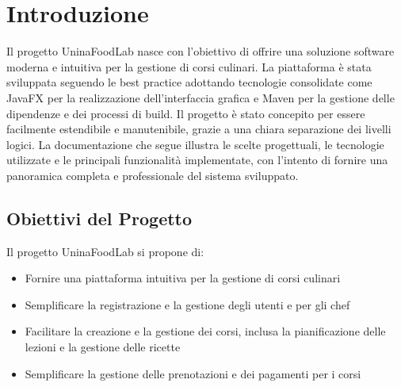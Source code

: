 \section{Introduzione}

Il progetto UninaFoodLab nasce con l'obiettivo di offrire una soluzione software moderna e intuitiva per la gestione di corsi culinari. La piattaforma è stata sviluppata seguendo le best practice adottando tecnologie consolidate come JavaFX per la realizzazione dell'interfaccia grafica e Maven per la gestione delle dipendenze e dei processi di build.
Il progetto è stato concepito per essere facilmente estendibile e manutenibile, grazie a una chiara separazione dei livelli logici.
La documentazione che segue illustra le scelte progettuali, le tecnologie utilizzate e le principali funzionalità implementate, con l'intento di fornire una panoramica completa e professionale del sistema sviluppato.
\subsection{Obiettivi del Progetto}
Il progetto UninaFoodLab si propone di:
\begin{itemize}
    \item Fornire una piattaforma intuitiva per la gestione di corsi culinari
    \item Semplificare la registrazione e la gestione degli utenti e per gli chef
    \item Facilitare la creazione e la gestione dei corsi, inclusa la pianificazione delle lezioni e la gestione delle ricette
    \item Semplificare la gestione delle prenotazioni e dei pagamenti per i corsi
\end{itemize}
